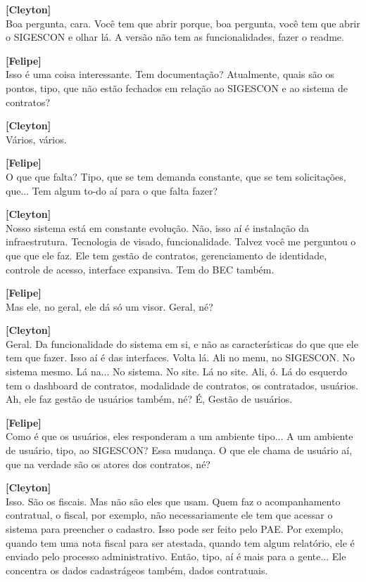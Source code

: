 \documentclass[12pt,a4paper]{article}
\begin{document}
\begin{entrevista}
    \textbf{[Cleyton]} \\
    Boa pergunta, cara. Você tem que abrir porque, boa pergunta, você tem que abrir o SIGESCON e olhar lá. A versão não tem as funcionalidades, fazer o readme.

    \textbf{[Felipe]} \\
    Isso é uma coisa interessante. Tem documentação? Atualmente, quais são os pontos, tipo, que não estão fechados em relação ao SIGESCON e ao sistema de contratos?

    \textbf{[Cleyton]} \\
    Vários, vários.

    \textbf{[Felipe]} \\
    O que que falta? Tipo, que se tem demanda constante, que se tem solicitações, que... Tem algum to-do aí para o que falta fazer?

    \textbf{[Cleyton]} \\
    Nosso sistema está em constante evolução. Não, isso aí é instalação da infraestrutura. Tecnologia de visado, funcionalidade. Talvez você me perguntou o que que ele faz. Ele tem gestão de contratos, gerenciamento de identidade, controle de acesso, interface expansiva. Tem do BEC também.

    \textbf{[Felipe]} \\
    Mas ele, no geral, ele dá só um visor. Geral, né?

    \textbf{[Cleyton]} \\
    Geral. Da funcionalidade do sistema em si, e não as características do que que ele tem que fazer. Isso aí é das interfaces. Volta lá. Ali no menu, no SIGESCON. No sistema mesmo. Lá na... No sistema. No site. Lá no site. Ali, ó. Lá do esquerdo tem o dashboard de contratos, modalidade de contratos, os contratados, usuários. Ah, ele faz gestão de usuários também, né? É, Gestão de usuários.

    \textbf{[Felipe]} \\
    Como é que os usuários, eles responderam a um ambiente tipo... A um ambiente de usuário, tipo, ao SIGESCON? Essa mudança. O que ele chama de usuário aí, que na verdade são os atores dos contratos, né?

    \textbf{[Cleyton]} \\
    Isso. São os fiscais. Mas não são eles que usam. Quem faz o acompanhamento contratual, o fiscal, por exemplo, não necessariamente ele tem que acessar o sistema para preencher o cadastro. Isso pode ser feito pelo PAE. Por exemplo, quando tem uma nota fiscal para ser atestada, quando tem algum relatório, ele é enviado pelo processo administrativo. Então, tipo, aí é mais para a gente... Ele concentra os dados cadastrágeos também, dados contratuais.


\end{entrevista}
\end{document}
